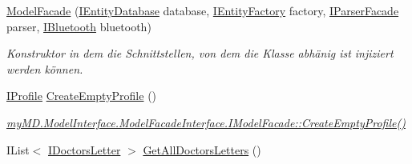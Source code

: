 \begin{CompactItemize}
\item 
\hyperlink{classmy_m_d_1_1_model_1_1_model_facade_1_1_model_facade_4061b342caa469526c255dfc7f68e440}{Model\-Facade} (\hyperlink{interfacemy_m_d_1_1_model_1_1_database_model_1_1_i_entity_database}{IEntity\-Database} database, \hyperlink{interfacemy_m_d_1_1_model_1_1_entity_factory_1_1_i_entity_factory}{IEntity\-Factory} factory, \hyperlink{interfacemy_m_d_1_1_model_1_1_parser_model_1_1_i_parser_facade}{IParser\-Facade} parser, \hyperlink{interfacemy_m_d_1_1_model_1_1_transmission_model_1_1_i_bluetooth}{IBluetooth} bluetooth)
\begin{CompactList}\small\item\em Konstruktor in dem die Schnittstellen, von dem die Klasse abh\"{a}nig ist injiziert werden k\"{o}nnen. \item\end{CompactList}\item 
\hypertarget{classmy_m_d_1_1_model_1_1_model_facade_1_1_model_facade_d81849285c0ecfe46b822095df995e8e}{
\hyperlink{interfacemy_m_d_1_1_model_interface_1_1_data_model_interface_1_1_i_profile}{IProfile} \hyperlink{classmy_m_d_1_1_model_1_1_model_facade_1_1_model_facade_d81849285c0ecfe46b822095df995e8e}{Create\-Empty\-Profile} ()}
\label{d5/dc0/classmy_m_d_1_1_model_1_1_model_facade_1_1_model_facade_d81849285c0ecfe46b822095df995e8e}

\begin{CompactList}\small\item\em \hyperlink{interfacemy_m_d_1_1_model_interface_1_1_model_facade_interface_1_1_i_model_facade_d81849285c0ecfe46b822095df995e8e}{my\-MD.Model\-Interface.Model\-Facade\-Interface.IModel\-Facade::Create\-Empty\-Profile()} \item\end{CompactList}\item 
\hypertarget{classmy_m_d_1_1_model_1_1_model_facade_1_1_model_facade_d824e78a8274c2fc04719a66a7030fd7}{
IList$<$ \hyperlink{interfacemy_m_d_1_1_model_interface_1_1_data_model_interface_1_1_i_doctors_letter}{IDoctors\-Letter} $>$ \hyperlink{classmy_m_d_1_1_model_1_1_model_facade_1_1_model_facade_d824e78a8274c2fc04719a66a7030fd7}{Get\-All\-Doctors\-Letters} ()}
\label{d5/dc0/classmy_m_d_1_1_model_1_1_model_facade_1_1_model_facade_d824e78a8274c2fc04719a66a7030fd7}


\end{CompactItemize}
